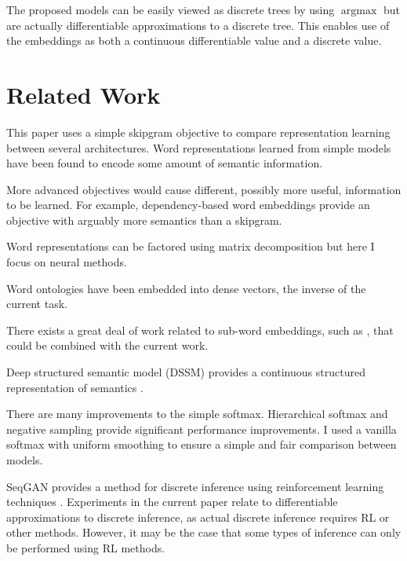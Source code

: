 \documentclass[sigconf]{acmart}
\begin{document}
The proposed models can be easily viewed as discrete trees by using $\operatorname{argmax}$ but are actually differentiable approximations to a discrete tree. This enables use of the embeddings as both a continuous differentiable value and a discrete value.

\section{Related Work}

This paper uses a simple skipgram objective to compare representation learning between several architectures. Word representations learned from simple models have been found to encode some amount of semantic information. \cite{DBLP:journals/corr/MikolovSCCD13} \cite{DBLP:journals/corr/abs-1301-3781}

More advanced objectives would cause different, possibly more useful, information to be learned. For example, dependency-based word embeddings provide an objective with arguably more semantics than a skipgram. \cite{Levy2014}

Word representations can be factored using matrix decomposition but here I focus on neural methods. \cite{pennington2014glove}

Word ontologies have been embedded into dense vectors, the inverse of the current task. \cite{Bordes:2011:LSE:2900423.2900470}

There exists a great deal of work related to sub-word embeddings, such as \cite{Li2015}, that could be combined with the current work.

Deep structured semantic model (DSSM) provides a continuous structured representation of semantics \cite{unsupervised-learning-of-word-semantic-embedding-using-the-deep-structured-semantic-model}. 

There are many improvements to the simple softmax. Hierarchical softmax \cite{Morin05hierarchicalprobabilistic} and negative sampling provide significant performance improvements. I used a vanilla softmax with uniform smoothing to ensure a simple and fair comparison between models.

SeqGAN provides a method for discrete inference using reinforcement learning techniques \cite{DBLP:journals/corr/YuZWY16}. Experiments in the current paper relate to differentiable approximations to discrete inference, as actual discrete inference requires RL or other methods. However, it may be the case that some types of inference can only be performed using RL methods.
\end{document}
